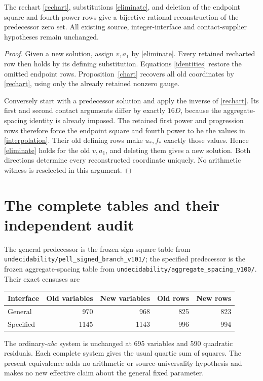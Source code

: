 \documentclass[11pt]{article}
\begin{document}
\begin{theorem}
The rechart \eqref{rechart}, substitutions \eqref{eliminate}, and
deletion of the endpoint square and fourth-power rows give a
bijective rational reconstruction of the predecessor zero set.
All existing source, integer-interface and contact-supplier hypotheses
remain unchanged.
\end{theorem}
\begin{proof}
Given a new solution, assign \(v,a_1\) by \eqref{eliminate}.
Every retained recharted row then holds by its defining substitution.
Equations \eqref{identities} restore the omitted endpoint rows.
Proposition~\ref{chart} recovers all old coordinates by
\eqref{rechart}, using only the already retained nonzero gauge.

Conversely start with a predecessor solution and apply the inverse
of \eqref{rechart}. Its first and second contact arguments differ
by exactly \(16D\), because the aggregate-spacing identity is
already imposed. The retained first power and progression rows
therefore force the endpoint square and fourth power to be the
values in \eqref{interpolation}. Their old defining rows make
\(u_*,f_*\) exactly those values. Hence \eqref{eliminate} holds
for the old \(v,a_1\), and deleting them gives a new solution.
Both directions determine every reconstructed coordinate uniquely.
No arithmetic witness is reselected in this argument.
\end{proof}

\section{The complete tables and their independent audit}

The general predecessor is the frozen sign-square table from
\nolinkurl{undecidability/pell_signed_branch_v101/}; the specified
predecessor is the frozen aggregate-spacing table from
\nolinkurl{undecidability/aggregate_spacing_v100/}. Their exact
censuses are
\begin{center}
\begin{tabular}{lrrrr}
\toprule
Interface & Old variables & New variables & Old rows & New rows\\
\midrule
General & 970 & 968 & 825 & 823\\
Specified & 1145 & 1143 & 996 & 994\\
\bottomrule
\end{tabular}
\end{center}
The ordinary-\(abc\) system is unchanged at 695 variables and
590 quadratic residuals. Each complete system gives the usual
quartic sum of squares. The present equivalence adds no arithmetic
or source-universality hypothesis and makes no new effective claim
about the general fixed parameter.
\end{document}
